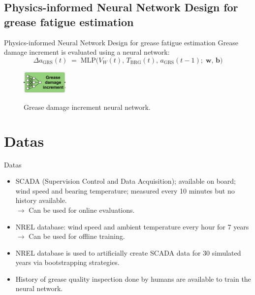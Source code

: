 \documentclass[aspectratio=169,xcolor=dvipsnames]{beamer}
\begin{document}
\subsection{Physics-informed Neural Network Design for grease fatigue estimation}
\begin{frame}{Physics-informed Neural Network Design for grease fatigue estimation}
    Grease damage increment is evaluated using a neural network:
    \begin{equation}
    \Delta a_{\mathrm{GRS}}(t) \;=\; \mathrm{MLP}\big(V_W(t),\,T_{\mathrm{BRG}}(t),\,a_{\mathrm{GRS}}(t-1);\;\mathbf{w},\,\mathbf{b}\big)
    \end{equation}
    \vfill
    \begin{figure}
        \centering
        \includegraphics[width=0.2\textwidth]{include/grease_NN.png}
        \label{fig:grease_NN}
        \caption{Grease damage increment neural network. \cite{YUCESAN2023110921}}
    \end{figure}
\end{frame}

\section{Datas}
\begin{frame}{Datas}
    \begin{itemize}
        \item SCADA (Supervision Control and Data Acquisition); available on board; wind speed and bearing temperature; measured every 10 minutes but no history available. \\ 
        $\rightarrow$ Can be used for  online evaluations.
        \item NREL database: wind speed and ambient temperature every hour for 7 years \\
        $\rightarrow$ Can be used for offline training.
        \item NREL database is used to artificially create SCADA data for 30 simulated years via bootstrapping strategies.
        \item History of grease quality inspection done by humans are available to train the neural network.
    \end{itemize}
\end{frame}
\end{document}
